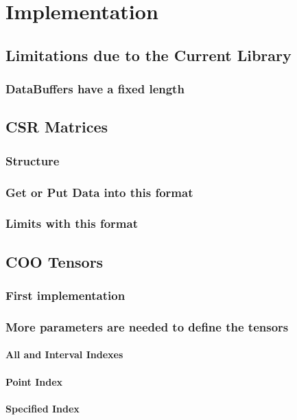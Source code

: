 \chapter{Implementation}

\section{Limitations due to the Current Library}
\subsection{DataBuffers have a fixed length}

\section{CSR Matrices}
\subsection{Structure}
\subsection{Get or Put Data into this format}
\subsection{Limits with this format}

\section{COO Tensors}
\subsection{First implementation}

\subsection{More parameters are needed to define the tensors}
\subsubsection{All and Interval Indexes}
\subsubsection{Point Index}
\subsubsection{Specified Index}

